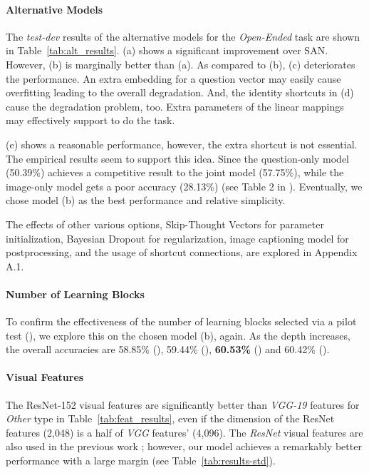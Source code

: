 \documentclass{article}
\begin{document}
\paragraph{Alternative Models} The \textit{test-dev} results of the alternative models for the \textit{Open-Ended} task are shown in Table~\ref{tab:alt_results}. (a) shows a significant improvement over SAN. However, (b) is marginally better than (a). As compared to (b), (c) deteriorates the performance. An extra embedding for a question vector may easily cause overfitting leading to the overall degradation. And, the identity shortcuts in (d) cause the degradation problem, too. Extra parameters of the linear mappings may effectively support to do the task. 

(e) shows a reasonable performance, however, the extra shortcut is not essential. The empirical results seem to support this idea. Since the question-only model (50.39\%) achieves a competitive result to the joint model (57.75\%), while the image-only model gets a poor accuracy (28.13\%) (see Table 2 in \cite{Antol2015}). Eventually, we chose model (b) as the best performance and relative simplicity.

The effects of other various options, Skip-Thought Vectors \cite{Kiros2015} for parameter initialization, Bayesian Dropout \cite{Gal2015} for regularization, image captioning model \cite{Karpathy} for postprocessing, and the usage of shortcut connections, are explored in Appendix A.1. 

\paragraph{Number of Learning Blocks} To confirm the effectiveness of the number of learning blocks selected via a pilot test (), we explore this on the chosen model (b), again. As the depth increases, the overall accuracies are 58.85\% (), 59.44\% (), \textbf{60.53\%} () and 60.42\% ().

\paragraph{Visual Features} The ResNet-152 visual features are significantly better than \textit{VGG-19} features for \textit{Other} type in Table~\ref{tab:feat_results}, even if the dimension of the ResNet features (2,048) is a half of \textit{VGG} features' (4,096). The \textit{ResNet} visual features are also used in the previous work \cite{Ilievski2016}; however, our model achieves a remarkably better performance with a large margin (see Table~\ref{tab:results-std}).
\end{document}
